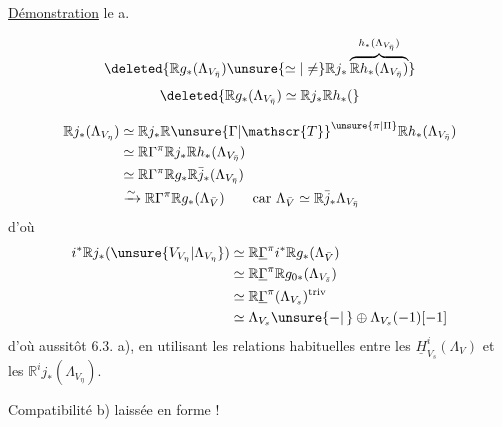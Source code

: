 
\uline{Démonstration} le a.

\[
\deleted{\mathbb{R}g_*(\Lambda_{V_{\bar\eta}})\unsure{\simeq|\ne}\mathbb{R}j_*\overbrace{\mathbb{R}h_*(\Lambda_{V_{\bar\eta}})}^{h_*(\Lambda_{V_{\bar\eta}})}}
\]
\[
\deleted{\mathbb{R}g_*(\Lambda_{V_{\bar\eta}})\simeq\mathbb{R}j_*\mathbb{R}h_*(}
\]

\[
\begin{aligned}
\mathbb{R}j_*(\Lambda_{V_\eta})&\simeq\mathbb{R}j_*\mathbb{R}{\unsure{\Gamma|\mathscr{T}}}^{\unsure{\pi|\Pi}}\mathbb{R}h_*(\Lambda_{V_{\bar\eta}})\\
&\simeq\mathbb{R}\Gamma^\pi\mathbb{R}j_*\mathbb{R}h_*(\Lambda_{V_{\bar\eta}})\\
&\simeq\mathbb{R}\Gamma^\pi\mathbb{R}g_*\mathbb{R}\bar j_*(\Lambda_{V_{\bar\eta}})\\
&\xrightarrow{\sim}\mathbb{R}\Gamma^\pi\mathbb{R}g_*(\Lambda_{\bar V})\qquad\text{car }\Lambda_{\bar V}\simeq\mathbb{R}\bar j_*\Lambda_{V_{\bar\eta}}
\end{aligned}
\]
d'où
\[
\begin{aligned}
i^*\mathbb{R}j_*(\unsure{V_{V_\eta}|\Lambda_{V_\eta}})&\simeq\mathbb{R}\underline\Gamma^\pi i^*\mathbb{R}g_*(\Lambda_{\bar V})\\
&\simeq\mathbb{R}\underline\Gamma^\pi\mathbb{R}g_{0*}(\Lambda_{V_{\bar s}})\\
&\simeq\mathbb{R}\underline\Gamma^\pi(\Lambda_{V_s})^{\mathrm{triv}}\\
&\simeq\Lambda_{V_s}\unsure{-|\,}\oplus\Lambda_{V_s}(-1)[-1]
\end{aligned}
\]
d'où aussitôt 6.3. a), en utilisant les relations habituelles entre les $\underline H^i_{V_s}(\Lambda_V)$ et les $\mathbb{R}^ij_*(\Lambda_{V_\eta})$.

Compatibilité b) laissée  en forme !
